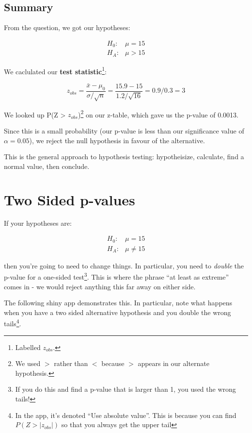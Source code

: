 \documentclass[
  letterpaper,
  DIV=11,
  numbers=noendperiod]{scrreprt}
\begin{document}
\hypertarget{summary-4}{%
\subsection{Summary}\label{summary-4}}

From the question, we got our hypotheses:\vspace{-7mm}

\begin{align*}
H_0: &\mu = 15\\
H_A: &\mu > 15
\end{align*}

We caclulated our \textbf{test statistic}\footnote{Labelled \(z_{obs}\).}:

\[ z_{obs} = \frac{\bar x - \mu_0}{\sigma/\sqrt{n}}  = \frac{15.9 - 15}{1.2/\sqrt{16}} = 0.9/0.3 = 3\]

We looked up P(Z \textgreater{} \(z_{obs}\))\footnote{We used \(>\)
  rather than \(<\) because \(>\) appears in our alternate hypothesis.}
on our z-table, which gave us the p-value of 0.0013.

Since this is a small probability (our p-value is less than our
significance value of \(\alpha = 0.05\)), we reject the null hypothesis
in favour of the alternative.

This is the general approach to hypothesis testing: hypotheisize,
calculate, find a normal value, then conclude.

\hypertarget{two-sided-p-values}{%
\section{Two Sided p-values}\label{two-sided-p-values}}

If your hypotheses are: \vspace{-4mm}

\begin{align*}
H_0: &\mu = 15\\
H_A: &\mu \ne 15
\end{align*}

then you're going to need to change things. In particular, you need to
\emph{double} the p-value for a one-sided test\footnote{If you do this
  and find a p-value that is larger than 1, you used the wrong tails!}.
This is where the phrase ``at least as extreme'' comes in - we would
reject anything this far away on either side.

The following shiny app demonstrates this. In particular, note what
happens when you have a two sided alternative hypothesis and you double
the wrong tails\footnote{In the app, it's denoted ``Use absolute
  value''. This is because you can find \(P(Z > |z_{obs}|)\) so that you
  always get the upper tail}.
\end{document}
